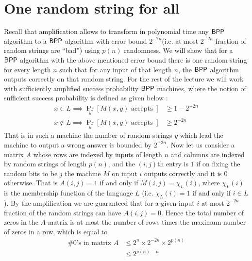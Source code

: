 \documentclass[11pt]{article}
\begin{document}
 

\section{One random string for all}
Recall that amplification allows to transform in polynomial time any
${\mathsf{BPP}}$ algorithm to a ${\mathsf{BPP}}$ algorithm with error bound
$2^{-2n}$(i.e. at most $2^{-2n}$ fraction of random strings are ``bad'')
using $p(n)$ randomness. We will show that for a ${\mathsf{BPP}}$ algorithm with
the above mentioned error bound there is one random string for every
length $n$ such that for any input of that length $n$, the ${\mathsf{BPP}}$
algorithm outputs correctly on that random string. For the rest of the
lecture we will work with sufficiently amplified success probability
${\mathsf{BPP}}$ machines, where the notion of sufficient success probability is
defined as given below :
\begin{align}
  x\in L \implies \Pr_{y} \left[ M(x,y) \text{ accepts } \right] & \geq
   1-2^{-2n} \\
  x \notin L \implies \Pr_{y}\left[ M(x,y) \text{ accepts } \right] & \geq
   2^{-2n} 
\end{align}
That is in such a machine the number of random strings $y$ which lead
the machine to output a wrong answer is bounded by $2^{-2n}$. Now let
us consider a matrix $A$ whose rows are indexed by inputs of length
$n$ and columns are indexed by random strings of length $p(n)$, and
the $(i,j)$th entry is $1$ if on fixing the random bits to be $j$ the
machine $M$ on input $i$ outputs correctly and it is $0$
otherwise. That is $A(i,j)=1$ if and only if $M(i,j)=\chi_L(i)$, where
$\chi_L(i)$ is the membership function of the language $L$
(i.e. $\chi_L(i)=1$ if and only if $i\in L$). By the amplification we
are guaranteed that for a given input $i$ at most $2^{-2n}$ fraction
of the random strings can have $A(i,j)=0$. Hence the total number of
zeros in the $A$ matrix is at most the number of rows times the
maximum number of zeros in a row, which is equal to 
\begin{eqnarray*}
  \text{\# 0's in matrix }A & \leq 2^n \times 2^{-2n} \times 2^{p(n)}
  \\
                            & \leq 2^{p(n)-n}
\end{eqnarray*}
\end{document}
